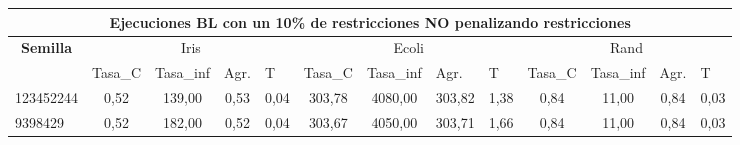 \documentclass[12pt, spanish]{article}
\begin{document}
\begin{table}[H]
\small

\begin{adjustwidth}{-1cm}{-1cm}%

\begin{tabular}{|l|c|c|c|c|c|c|c|c|c|c|c|c|}
\hline
\multicolumn{13}{|c|}{\textbf{Ejecuciones BL con un 10\% de restricciones NO penalizando restricciones}}                                                                                                                                                                                                                                                                                                               \\ \hline
\multicolumn{1}{|c|}{\multirow{2}{*}{\textbf{Semilla}}} & \multicolumn{4}{c|}{Iris}                                                                                          & \multicolumn{4}{c|}{Ecoli}                                                                                         & \multicolumn{4}{c|}{Rand}                                                                                          \\ \cline{2-13} 
\multicolumn{1}{|c|}{}                                  & \multicolumn{1}{l|}{Tasa\_C} & \multicolumn{1}{l|}{Tasa\_inf} & \multicolumn{1}{l|}{Agr.} & \multicolumn{1}{l|}{T} & \multicolumn{1}{l|}{Tasa\_C} & \multicolumn{1}{l|}{Tasa\_inf} & \multicolumn{1}{l|}{Agr.} & \multicolumn{1}{l|}{T} & \multicolumn{1}{l|}{Tasa\_C} & \multicolumn{1}{l|}{Tasa\_inf} & \multicolumn{1}{l|}{Agr.} & \multicolumn{1}{l|}{T} \\ \hline
123452244                                               & 0,52                         & 139,00                         & 0,53                      & 0,04                   & 303,78                       & 4080,00                        & 303,82                    & 1,38                   & 0,84                         & 11,00                          & 0,84                      & 0,03                   \\ \hline
9398429                                                 & 0,52                         & 182,00                         & 0,52                      & 0,04                   & 303,67                       & 4050,00                        & 303,71                    & 1,66                   & 0,84                         & 11,00                          & 0,84                      & 0,03                   \\ \hline

\end{tabular}
\end{adjustwidth}
\end{table}
\end{document}
